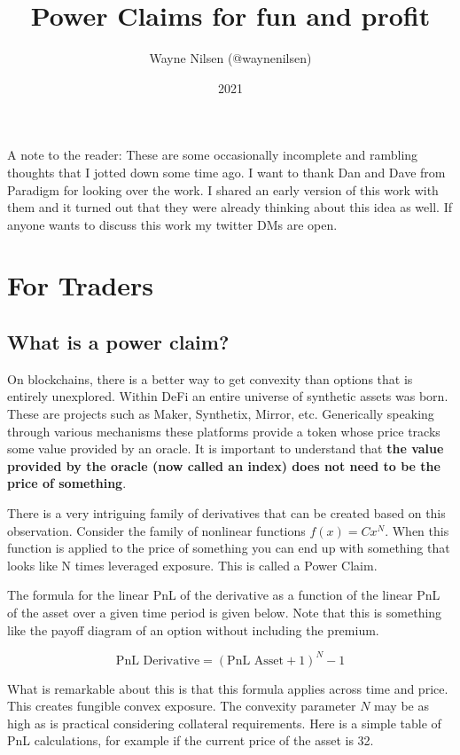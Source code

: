 \documentclass[12pt]{article}
\title{Power Claims for fun and profit}
\author{Wayne Nilsen (@waynenilsen)}
\date{2021}
\begin{document}
    \maketitle
    A note to the reader: These are some occasionally incomplete and rambling thoughts that I jotted down some time ago. I want to thank Dan and Dave from Paradigm for looking over the work. I shared an early version of this work with them and it turned out that they were already thinking about this idea as well. If anyone wants to discuss this work my twitter DMs are open.

    \section{For Traders}

    \subsection{What is a power claim?}

    On blockchains, there is a better way to get convexity than options that is entirely unexplored. Within DeFi an entire universe of synthetic assets was born. These are projects such as Maker, Synthetix, Mirror, etc. Generically speaking through various mechanisms these platforms provide a token whose price tracks some value provided by an oracle. It is important to understand that \textbf{the value provided by the oracle (now called an index) does not need to be the price of something}.

    There is a very intriguing family of derivatives that can be created based on this observation. Consider the family of nonlinear functions $f(x) = C x^N$. When this function is applied to the price of something you can end up with something that looks like N times leveraged exposure. This is called a Power Claim.

    The formula for the linear PnL of the derivative as a function of the linear PnL of the asset over a given time period is given below. Note that this is something like the payoff diagram of an option without including the premium.

    \begin{equation*}
        \text{PnL Derivative} = (\text{PnL Asset} + 1)^N - 1
    \end{equation*}

    What is remarkable about this is that this formula applies across time and price. This creates fungible convex exposure. The convexity parameter $N$ may be as high as is practical considering collateral requirements. Here is a simple table of PnL calculations, for example if the current price of the asset is 32.
\end{document}
